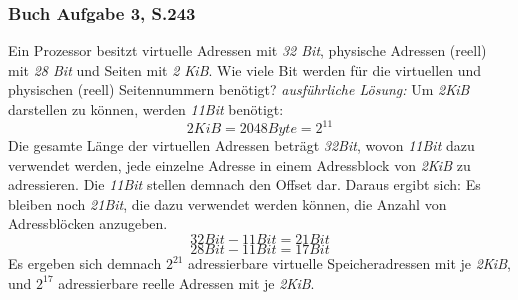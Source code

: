 \documentclass[12pt,a4paper]{article}
\begin{document}
\subsubsection{Buch Aufgabe 3, S.243}
    Ein Prozessor besitzt virtuelle Adressen mit \textit{32 Bit}, physische Adressen (reell) mit \textit{28 Bit} und Seiten mit \textit{2 KiB}.\newline
    Wie viele Bit werden für die virtuellen und physischen (reell) Seitennummern benötigt?\newline \newline
    \noindent \textit{ausführliche Lösung:} \newline
    Um \textit{2KiB} darstellen zu können, werden \textit{11Bit} benötigt:
    \begin{equation*}
        2KiB = 2048Byte = 2^{11}
    \end{equation*}
    Die gesamte Länge der virtuellen Adressen beträgt \textit{32Bit}, wovon \textit{11Bit} dazu verwendet werden, jede einzelne Adresse in einem Adressblock von \textit{2KiB} zu adressieren. Die \textit{11Bit} stellen demnach den Offset dar. Daraus ergibt sich:\newline
    Es bleiben noch \textit{21Bit}, die dazu verwendet werden können, die Anzahl von Adressblöcken anzugeben.
    \begin{equation*}
        32Bit - 11Bit = 21Bit
    \end{equation*}
    \begin{equation*}
        28Bit - 11Bit = 17Bit
    \end{equation*}
    Es ergeben sich demnach $2^{21}$ adressierbare virtuelle Speicheradressen mit je \textit{2KiB},\newline
    und $2^{17}$ adressierbare reelle Adressen mit je \textit{2KiB}.
\end{document}
